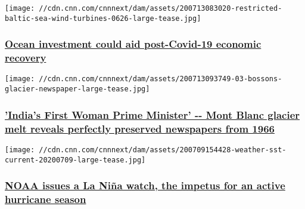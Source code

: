 \href{/2020/07/13/world/ocean-investment-world-resources-institute-cte/index.html}{}

\texttt{[image: //cdn.cnn.com/cnnnext/dam/assets/200713083020-restricted-baltic-sea-wind-turbines-0626-large-tease.jpg]}

\hypertarget{ocean-investment-could-aid-post-covid-19-economic-recovery}{%
\subsubsection{\texorpdfstring{\href{/2020/07/13/world/ocean-investment-world-resources-institute-cte/index.html}{Ocean
investment could aid post-Covid-19 economic
recovery}}{Ocean investment could aid post-Covid-19 economic recovery}}\label{ocean-investment-could-aid-post-covid-19-economic-recovery}}

\href{/2020/07/13/europe/mont-blanc-glacier-newspapers-scli-intl/index.html}{}

\texttt{[image: //cdn.cnn.com/cnnnext/dam/assets/200713093749-03-bossons-glacier-newspaper-large-tease.jpg]}

\hypertarget{indias-first-woman-prime-minister----mont-blanc-glacier-melt-reveals-perfectly-preserved-newspapers-from-1966-}{%
\subsubsection{\texorpdfstring{\href{/2020/07/13/europe/mont-blanc-glacier-newspapers-scli-intl/index.html}{'India's
First Woman Prime Minister' -\/- Mont Blanc glacier melt reveals
perfectly preserved newspapers from 1966
}}{'India's First Woman Prime Minister' -\/- Mont Blanc glacier melt reveals perfectly preserved newspapers from 1966 }}\label{indias-first-woman-prime-minister----mont-blanc-glacier-melt-reveals-perfectly-preserved-newspapers-from-1966-}}

\href{/2020/07/09/weather/la-nia-2020-watch-noaa-forecast-hurricane/index.html}{}

\texttt{[image: //cdn.cnn.com/cnnnext/dam/assets/200709154428-weather-sst-current-20200709-large-tease.jpg]}

\hypertarget{noaa-issues-a-la-niuxf1a-watch-the-impetus-for-an-active-hurricane-season}{%
\subsubsection{\texorpdfstring{\href{/2020/07/09/weather/la-nia-2020-watch-noaa-forecast-hurricane/index.html}{NOAA
issues a La Niña watch, the impetus for an active hurricane
season}}{NOAA issues a La Niña watch, the impetus for an active hurricane season}}\label{noaa-issues-a-la-niuxf1a-watch-the-impetus-for-an-active-hurricane-season}}

